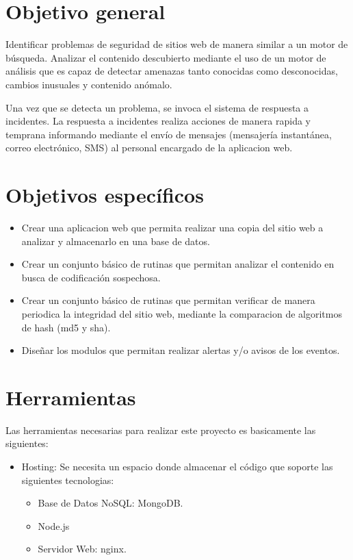 \documentclass[letter,twoside,11pt]{article}
\begin{document}
\section{Objetivo general}
Identificar problemas de seguridad de sitios web de manera similar a un motor de
búsqueda. Analizar el contenido descubierto mediante el uso de un motor de
análisis que es capaz de detectar amenazas tanto conocidas como desconocidas,
cambios inusuales y contenido anómalo.

Una vez que se detecta un problema, se invoca el sistema de respuesta a
incidentes. La respuesta a incidentes realiza acciones de manera rapida y
temprana informando mediante el envío de mensajes (mensajería instantánea,
correo electrónico, SMS) al personal encargado de la aplicacion web.

\section{Objetivos específicos}
\begin{itemize}
\item Crear una aplicacion web que permita realizar una copia del sitio web a
    analizar y almacenarlo en una base de datos.
\item Crear un conjunto básico de rutinas que permitan analizar el contenido en
    busca de codificación sospechosa.
\item Crear un conjunto básico de rutinas que permitan verificar de manera
    periodica la integridad del sitio web, mediante la comparacion de algoritmos
    de hash (md5 y sha).
\item Diseñar los modulos que permitan realizar alertas y/o avisos de los
    eventos.
\end{itemize}

\section{Herramientas}
Las herramientas necesarias para realizar este proyecto es basicamente las
siguientes:

\begin{itemize}
\item Hosting: Se necesita un espacio donde almacenar el código que soporte las
    siguientes tecnologias:
    \begin{itemize}
    \item Base de Datos NoSQL: MongoDB.
    \item Node.js
    \item Servidor Web: nginx.
    \end{itemize}
\end{itemize}
\end{document}
